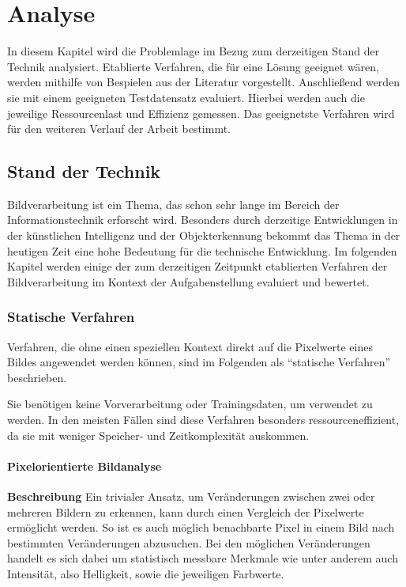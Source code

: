 \chapter{Analyse}
In diesem Kapitel wird die Problemlage im Bezug zum derzeitigen Stand der Technik analysiert.
Etablierte Verfahren, die für eine Lösung geeignet wären, werden mithilfe von Bespielen aus der Literatur vorgestellt.
Anschließend werden sie mit einem geeigneten Testdatensatz evaluiert.
Hierbei werden auch die jeweilige Ressourcenlast und Effizienz gemessen.
Das geeignetste Verfahren wird für den weiteren Verlauf der Arbeit bestimmt.

\section{Stand der Technik}
Bildverarbeitung ist ein Thema, das schon sehr lange im Bereich der Informationstechnik erforscht wird.
Besonders durch derzeitige Entwicklungen in der künstlichen Intelligenz und der Objekterkennung bekommt das Thema in der heutigen Zeit eine hohe Bedeutung für die technische Entwicklung. Im folgenden Kapitel werden einige der zum derzeitigen Zeitpunkt etablierten Verfahren der Bildverarbeitung im Kontext der Aufgabenstellung evaluiert und bewertet.

\subsection{Statische Verfahren}
Verfahren, die ohne einen speziellen Kontext direkt auf die Pixelwerte eines Bildes angewendet werden können, sind im Folgenden als "`statische Verfahren"' beschrieben. 

Sie benötigen keine Vorverarbeitung oder Trainingsdaten, um verwendet zu werden.
In den meisten Fällen sind diese Verfahren besonders ressourceneffizient, da sie mit weniger Speicher- und Zeitkomplexität auskommen.
\subsubsection{Pixelorientierte Bildanalyse}
\textbf{Beschreibung}\newline
Ein trivialer Ansatz, um Veränderungen zwischen zwei oder mehreren Bildern zu erkennen, kann durch einen Vergleich der Pixelwerte ermöglicht werden.
So ist es auch möglich benachbarte Pixel in einem Bild nach bestimmten Veränderungen abzusuchen.
Bei den möglichen Veränderungen handelt es sich dabei um statistisch messbare Merkmale wie unter anderem auch Intensität, also Helligkeit, sowie die jeweiligen Farbwerte.

